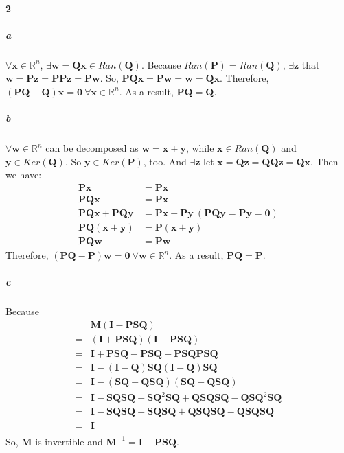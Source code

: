 \documentclass[22pt]{article}
\begin{document}
	\paragraph{2}
		\subparagraph{a}$\forall \mathbf{x} \in \mathbb{R}^{n}$, $\exists \mathbf{w} = \mathbf{Qx} \in Ran(\mathbf{Q})$. Because $Ran(\mathbf{P}) = Ran(\mathbf{Q})$, $\exists \mathbf{z}$ that $\mathbf{w} = \mathbf{Pz} = \mathbf{PPz} = \mathbf{Pw}$. So, $\mathbf{PQx} = \mathbf{Pw} = \mathbf{w} = \mathbf{Qx}$. Therefore, $(\mathbf{PQ}-\mathbf{Q})\mathbf{x} = \mathbf{0}\  \forall \mathbf{x} \in \mathbb{R}^n$. As a result, $\mathbf{PQ} = \mathbf{Q}$.

		\subparagraph{b}$\forall \mathbf{w} \in \mathbb{R}^{n}$ can be decomposed as $\mathbf{w} = \mathbf{x} + \mathbf{y}$, while $\mathbf{x} \in Ran(\mathbf{Q})$ and $\mathbf{y} \in Ker(\mathbf{Q})$. So $\mathbf{y} \in Ker(\mathbf{P})$, too. And $\exists \mathbf{z}$ let $\mathbf{x} = \mathbf{Qz} = \mathbf{QQz} = \mathbf{Qx}$. Then we have:
		\begin{align}
			\mathbf{Px} & = \mathbf{Px}\\
			\mathbf{PQx} & = \mathbf{Px} \\
			\mathbf{PQx} + \mathbf{PQy} & = \mathbf{Px} + \mathbf{Py} \ (\mathbf{PQy} = \mathbf{Py} = \mathbf{0})\\
			\mathbf{PQ(x+y)} & = \mathbf{P(x+y)}\\
			\mathbf{PQw} & = \mathbf{Pw}
		\end{align}
		Therefore, $(\mathbf{PQ}-\mathbf{P})\mathbf{w} = \mathbf{0}\  \forall \mathbf{w} \in \mathbb{R}^n$. As a result, $\mathbf{PQ} = \mathbf{P}$.


		\subparagraph{c}Because
		\begin{align}
		&\mathbf{M}(\mathbf{I}-\mathbf{PSQ})\\
		=&(\mathbf{I}+\mathbf{PSQ})(\mathbf{I}-\mathbf{PSQ})\\
		=&\mathbf{I} + \mathbf{PSQ} - \mathbf{PSQ} -\mathbf{PSQPSQ}\\
		=&\mathbf{I} - (\mathbf{I}-\mathbf{Q})\mathbf{SQ}(\mathbf{I}-\mathbf{Q})\mathbf{SQ}\\
		=&\mathbf{I} - (\mathbf{SQ} - \mathbf{QSQ})(\mathbf{SQ} - \mathbf{QSQ})\\
		=&\mathbf{I} - \mathbf{SQSQ} + \mathbf{SQ}^2\mathbf{SQ} +\mathbf{QSQSQ} - \mathbf{QSQ}^2\mathbf{SQ}\\
		=&\mathbf{I} - \mathbf{SQSQ} + \mathbf{SQSQ}+\mathbf{QSQSQ}- \mathbf{QSQSQ}\\
		=&\mathbf{I}\\
		\end{align}
		So, $\mathbf{M}$ is invertible and $\mathbf{M}^{-1}=\mathbf{I}-\mathbf{PSQ}$.
\end{document}
